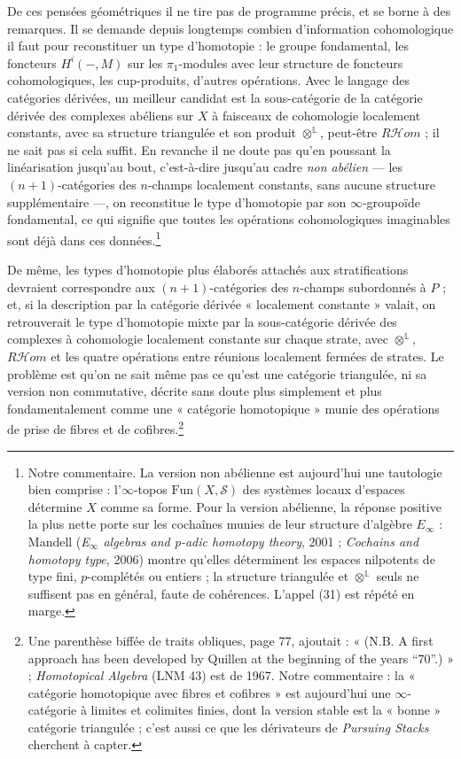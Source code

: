 \documentclass[11pt,a4paper]{article}
\begin{document}
De ces pensées géométriques il ne tire pas de programme précis, et se borne
à des remarques. Il se demande depuis longtemps combien d'information
cohomologique il faut pour reconstituer un type d'homotopie : le groupe
fondamental, les foncteurs $H^i(-,M)$ sur les $\pi_1$-modules avec leur
structure de foncteurs cohomologiques, les cup-produits, d'autres
opérations. Avec le langage des catégories dérivées, un meilleur candidat
est la sous-catégorie de la catégorie dérivée des complexes abéliens sur $X$
à faisceaux de cohomologie localement constants, avec sa structure
triangulée et son produit $\otimes^{\mathbb{L}}$, peut-être
$R\mathcal{H}om$ ; il ne sait pas si cela suffit. En revanche il ne doute pas
qu'en poussant la linéarisation jusqu'au bout, c'est-à-dire jusqu'au cadre
\emph{non abélien} --- les $(n+1)$-catégories des $n$-champs localement
constants, sans aucune structure supplémentaire ---, on reconstitue le type
d'homotopie par son $\infty$-groupoïde fondamental, ce qui signifie que
toutes les opérations cohomologiques imaginables sont déjà dans ces
données.\footnote{Notre commentaire. La version non abélienne est
aujourd'hui une tautologie bien comprise : l'$\infty$-topos
$\mathrm{Fun}(X,\mathcal{S})$ des systèmes locaux d'espaces détermine $X$
comme sa forme. Pour la version abélienne, la réponse positive la plus
nette porte sur les cochaînes munies de leur structure d'algèbre
$E_\infty$ : Mandell (\emph{E$_\infty$ algebras and p-adic homotopy theory},
2001 ; \emph{Cochains and homotopy type}, 2006) montre qu'elles déterminent
les espaces nilpotents de type fini, $p$-complétés ou entiers ; la
structure triangulée et $\otimes^{\mathbb{L}}$ seuls ne suffisent pas en
général, faute de cohérences. L'appel (31) est répété en marge.}

De même, les types d'homotopie plus élaborés attachés aux stratifications
devraient correspondre aux $(n+1)$-catégories des $n$-champs subordonnés à
$P$ ; et, si la description par la catégorie dérivée « localement
constante » valait, on retrouverait le type d'homotopie mixte par la
sous-catégorie dérivée des complexes à cohomologie localement constante sur
chaque strate, avec $\otimes^{\mathbb{L}}$, $R\mathcal{H}om$ et les quatre
opérations entre réunions localement fermées de strates. Le problème est
qu'on ne sait même pas ce qu'est une catégorie triangulée, ni sa version
non commutative, décrite sans doute plus simplement et plus
fondamentalement comme une « catégorie homotopique » munie des opérations
de prise de fibres et de cofibres.\footnote{Une parenthèse biffée de
traits obliques, page 77, ajoutait : « (N.B. A first approach has been
developed by Quillen at the beginning of the years “70”.) » ;
\emph{Homotopical Algebra} (LNM 43) est de 1967. Notre commentaire : la
« catégorie homotopique avec fibres et cofibres » est aujourd'hui une
$\infty$-catégorie à limites et colimites finies, dont la version stable
est la « bonne » catégorie triangulée ; c'est aussi ce que les dérivateurs
de \emph{Pursuing Stacks} cherchent à capter.}
\end{document}
